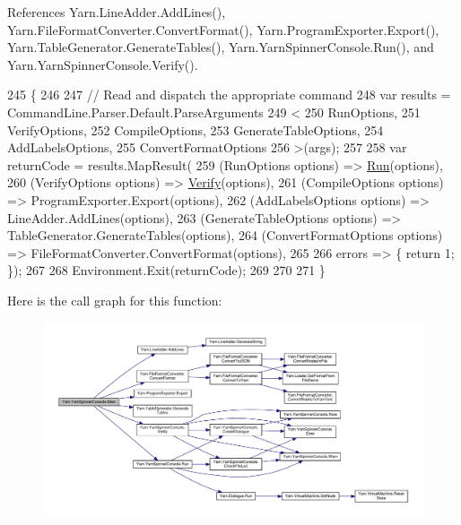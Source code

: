 References Yarn.\-Line\-Adder.\-Add\-Lines(), Yarn.\-File\-Format\-Converter.\-Convert\-Format(), Yarn.\-Program\-Exporter.\-Export(), Yarn.\-Table\-Generator.\-Generate\-Tables(), Yarn.\-Yarn\-Spinner\-Console.\-Run(), and Yarn.\-Yarn\-Spinner\-Console.\-Verify().


\begin{DoxyCode}
245         \{
246 
247             \textcolor{comment}{// Read and dispatch the appropriate command}
248             var results = CommandLine.Parser.Default.ParseArguments
249             <
250             RunOptions,
251             VerifyOptions,
252             CompileOptions,
253             GenerateTableOptions,
254             AddLabelsOptions,
255             ConvertFormatOptions
256             >(args);
257 
258             var returnCode = results.MapResult(
259                 (RunOptions options) => \hyperlink{a00197_a1b974c55540795a9e643c2ec055fbd51}{Run}(options),
260                 (VerifyOptions options) => \hyperlink{a00197_a029a5624e7cc3a16ae586b64f13049de}{Verify}(options),
261                 (CompileOptions options) => ProgramExporter.Export(options),
262                 (AddLabelsOptions options) => LineAdder.AddLines(options),
263                 (GenerateTableOptions options) => TableGenerator.GenerateTables(options),
264                 (ConvertFormatOptions options) => FileFormatConverter.ConvertFormat(options),
265 
266                 errors => \{ \textcolor{keywordflow}{return} 1; \});
267 
268             Environment.Exit(returnCode);
269 
270 
271         \}
\end{DoxyCode}


Here is the call graph for this function\-:
\nopagebreak
\begin{figure}[H]
\begin{center}
\leavevmode
\includegraphics[width=350pt]{a00197_a1d71ff2eb190449ea1d42ce86f44489f_cgraph}
\end{center}
\end{figure}


